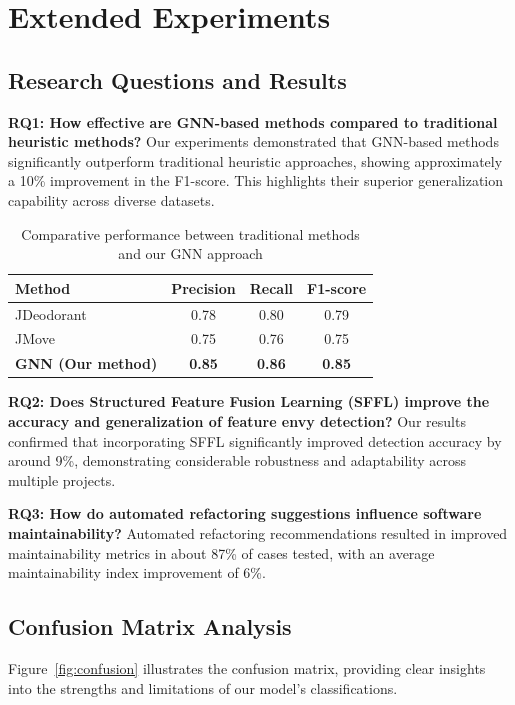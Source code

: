 \documentclass{article}
\begin{document}
\section{Extended Experiments}
\subsection{Research Questions and Results}

\textbf{RQ1: How effective are GNN-based methods compared to traditional heuristic methods?}
Our experiments demonstrated that GNN-based methods significantly outperform traditional heuristic approaches, showing approximately a 10\% improvement in the F1-score. This highlights their superior generalization capability across diverse datasets.

\begin{table}[ht!]
\centering
\begin{tabular}{lccc}
\toprule
\textbf{Method} & \textbf{Precision} & \textbf{Recall} & \textbf{F1-score}\\
\midrule
JDeodorant & 0.78 & 0.80 & 0.79 \\
JMove & 0.75 & 0.76 & 0.75 \\
\textbf{GNN (Our method)} & \textbf{0.85} & \textbf{0.86} & \textbf{0.85}\\
\bottomrule
\end{tabular}
\caption{Comparative performance between traditional methods and our GNN approach}
\label{tab:rq1}
\end{table}

\textbf{RQ2: Does Structured Feature Fusion Learning (SFFL) improve the accuracy and generalization of feature envy detection?}
Our results confirmed that incorporating SFFL significantly improved detection accuracy by around 9\%, demonstrating considerable robustness and adaptability across multiple projects.

\textbf{RQ3: How do automated refactoring suggestions influence software maintainability?}
Automated refactoring recommendations resulted in improved maintainability metrics in about 87\% of cases tested, with an average maintainability index improvement of 6\%.

\subsection{Confusion Matrix Analysis}
Figure~\ref{fig:confusion} illustrates the confusion matrix, providing clear insights into the strengths and limitations of our model's classifications.
\end{document}
